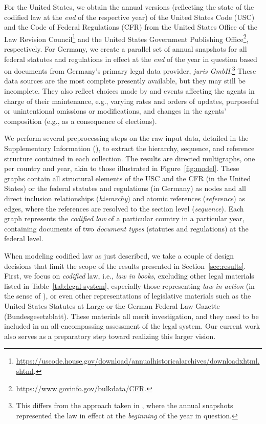 For the United States, we obtain the annual versions (reflecting the state of the codified law at the \emph{end} of the respective year) of the United States Code (USC) and the Code of Federal Regulations (CFR) from the United States Office of the Law Revision Council\footnote{\url{https://uscode.house.gov/download/annualhistoricalarchives/downloadxhtml.shtml}.} and the United States Government Publishing Office\footnote{\url{https://www.govinfo.gov/bulkdata/CFR}.}, respectively.
For Germany, we create a parallel set of annual snapshots for all federal statutes and regulations in effect at the \emph{end} of the year in question based on documents from Germany’s primary legal data provider, \emph{juris GmbH}.\footnote{
This differs from the approach taken in \cite{katz2020}, where the annual snapshots represented the law in effect at the \emph{beginning} of the year in question.
}
These data sources are the most complete presently available, 
but they may still be incomplete.
They also reflect choices made by and events affecting the agents in charge of their maintenance, e.g., varying rates and orders of updates, purposeful or unintentional omissions or modifications, and changes in the agents' composition (e.g., as a consequence of elections).

We perform several preprocessing steps on the raw input data, detailed in the Supplementary Information (\thesi), to extract the hierarchy, sequence, and reference structure contained in each collection.
The results are directed multigraphs, one per country and year, akin to those illustrated in Figure~\ref{fig:model}. 
These graphs contain all structural elements of the USC and the CFR (in the United States) or the federal statutes and regulations (in Germany) as nodes 
and all direct inclusion relationships (\emph{hierarchy}) and atomic references (\emph{reference}) as edges, where the references are resolved to the section level (\emph{sequence}).
Each graph represents the \emph{codified law} of a particular country in a particular year, containing documents of two \emph{document types} (statutes and regulations) at the federal level.

When modeling codified law as just described, we take a couple of design decisions that limit the scope of the results presented in Section~\ref{sec:results}. 
First, we focus on \emph{codified} law, i.e., \emph{law in books}, excluding other legal materials listed in Table~\ref{tab:legal-system}, especially those representing \emph{law in action} (in the sense of \cite{pound1910}),  
or even other representations of legislative materials such as the United States Statutes at Large or the German Federal Law Gazette (Bundesgesetzblatt).
These materials all merit investigation, and they need to be included in an all-encompassing assessment of the legal system. 
Our current work also serves as a preparatory step toward realizing this larger vision.


